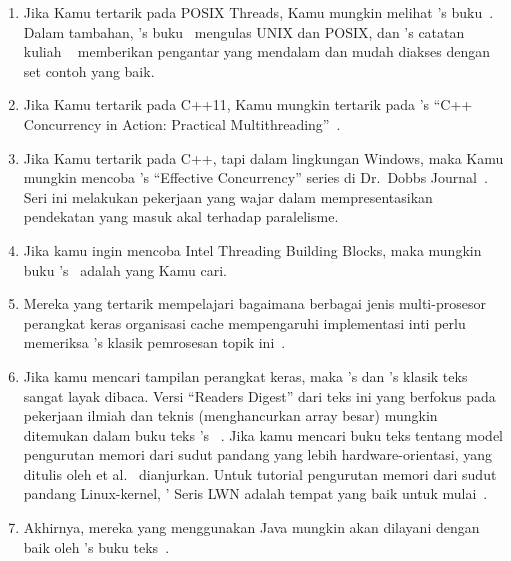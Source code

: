 \begin{enumerate}
\item	Jika Kamu tertarik pada POSIX Threads, Kamu mungkin
	melihat 's buku~\cite{Butenhof1997pthreads}.
	Dalam tambahan,
	's buku~\cite{WRichardStevens1992,WRichardStevens2013}
	mengulas UNIX dan POSIX, dan 's catatan kuliah
	~\cite{StewartWeiss2013UNIX} memberikan
	pengantar yang mendalam dan mudah diakses dengan set contoh yang baik.
\item	Jika Kamu tertarik pada C++11, Kamu mungkin tertarik pada
	's ``C++ Concurrency in Action:
	Practical Multithreading''~\cite{AnthonyWilliams2012,AnthonyWilliams2019}.
\item 	Jika Kamu tertarik pada C++, tapi dalam lingkungan Windows,
	maka Kamu mungkin mencoba 's ``Effective Concurrency''
	series di
	Dr.~Dobbs Journal~\cite{HerbSutter2008EffectiveConcurrency}.
	Seri ini melakukan pekerjaan yang wajar dalam mempresentasikan
	pendekatan yang masuk akal terhadap paralelisme.
\item	Jika kamu ingin mencoba Intel Threading Building Blocks,
	maka mungkin buku 's~\cite{Reinders2007Textbook}
	adalah yang Kamu cari.
\item	Mereka yang tertarik mempelajari bagaimana berbagai jenis multi-prosesor
	perangkat keras
	organisasi cache mempengaruhi implementasi inti
	perlu memeriksa 's klasik
	pemrosesan topik ini~\cite{Schimmel:1994:USM:175689}.
\item 	Jika kamu mencari tampilan perangkat keras,
	maka 's dan 's
	klasik teks~\cite{Hennessy2017,Hennessy2011} sangat layak dibaca.
	Versi ``Readers Digest'' dari teks ini yang berfokus pada
	pekerjaan ilmiah dan teknis (menghancurkan array besar)
	mungkin ditemukan dalam buku teks 's
	~\cite{AndrewChien2022ComputerArchitectureScientists}.
	Jika kamu mencari buku teks tentang model pengurutan memori
	dari sudut pandang yang lebih hardware-orientasi,
	yang ditulis oleh  et al.~\cite{DanielJSorin2011MemModel,%
	VijayNagarajan2020MemModel}
	dianjurkan.
	Untuk tutorial pengurutan memori dari sudut pandang Linux-kernel,
	' Seris LWN adalah tempat yang baik untuk
	mulai~\cite{PaoloBonzini2021lockless1,PaoloBonzini2021lockless2,PaoloBonzini2021lockless3,PaoloBonzini2021lockless4,PaoloBonzini2021lockless5,PaoloBonzini2021lockless6}.
\item 	Akhirnya, mereka yang menggunakan Java mungkin akan
	dilayani dengan baik oleh 's
	buku teks~\cite{DougLea1997Textbook,Goetz2007Textbook}.
\end{enumerate}

